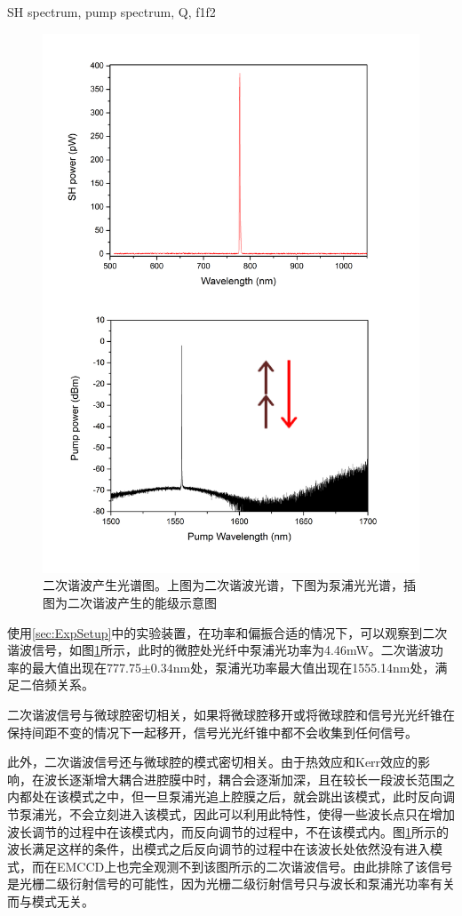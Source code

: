 \documentclass[UTF8,a4paper,cs4size,hyperref]{ctexart}
\begin{document}
SH spectrum, pump spectrum, Q, f1f2
\begin{figure}
\centering
\includegraphics[width=14cm ]{FigSHspectrum}
\caption{二次谐波产生光谱图。上图为二次谐波光谱，下图为泵浦光光谱，插图为二次谐波产生的能级示意图}
\label{pic:FigSHspectrum}
\end{figure}

使用\ref{sec:ExpSetup}中的实验装置，在功率和偏振合适的情况下，可以观察到二次谐波信号，如图\ref{pic:FigSHspectrum}所示，此时的微腔处光纤中泵浦光功率为4.46mW。二次谐波功率的最大值出现在777.75$\pm0.34$nm处，泵浦光功率最大值出现在1555.14nm处，满足二倍频关系。

二次谐波信号与微球腔密切相关，如果将微球腔移开或将微球腔和信号光光纤锥在保持间距不变的情况下一起移开，信号光光纤锥中都不会收集到任何信号。

此外，二次谐波信号还与微球腔的模式密切相关。由于热效应和Kerr效应的影响，在波长逐渐增大耦合进腔膜中时，耦合会逐渐加深，且在较长一段波长范围之内都处在该模式之中，但一旦泵浦光追上腔膜之后，就会跳出该模式，此时反向调节泵浦光，不会立刻进入该模式\cite{carmon2004dynamical}，因此可以利用此特性，使得一些波长点只在增加波长调节的过程中在该模式内，而反向调节的过程中，不在该模式内。图\ref{pic:FigSHspectrum}所示的波长满足这样的条件，出模式之后反向调节的过程中在该波长处依然没有进入模式，而在EMCCD上也完全观测不到该图所示的二次谐波信号。由此排除了该信号是光栅二级衍射信号的可能性，因为光栅二级衍射信号只与波长和泵浦光功率有关而与模式无关。
\end{document}

